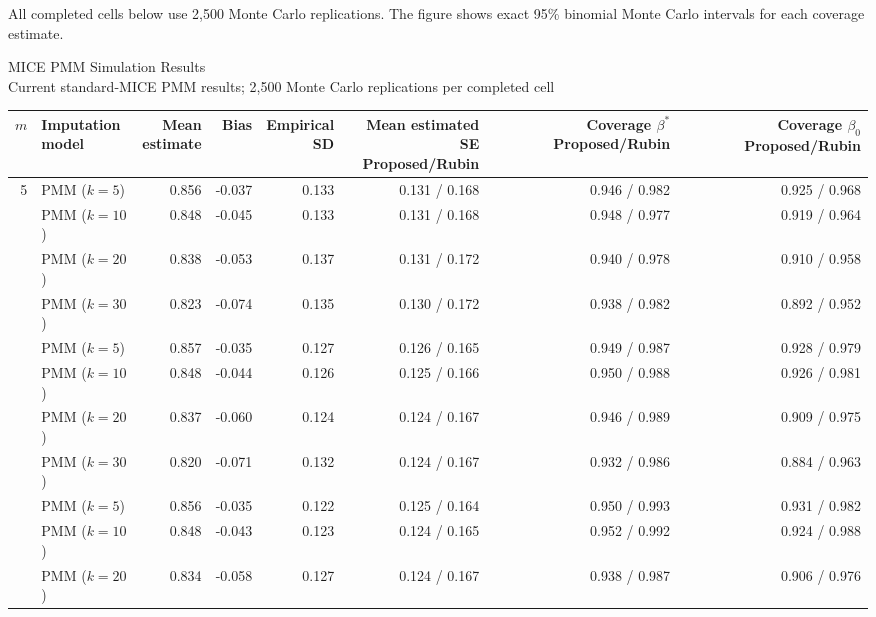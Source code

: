 \documentclass[11pt]{article}
\begin{document}
All completed cells below use 2,500 Monte Carlo replications. The figure shows exact 95\% binomial Monte Carlo intervals for each coverage estimate.
\clearpage
\begin{center}
{\Large MICE PMM Simulation Results}\\[4pt]
{\normalsize Current standard-MICE PMM results; 2,500 Monte Carlo replications per completed cell}
\end{center}
\vspace{4pt}
\begin{table}[H]
\centering
\scriptsize
\setlength{\tabcolsep}{2.6pt}
\begin{tabular}{rlrrrrrr}
\toprule
$m$ & \makecell{Imputation\\model} & \makecell{Mean\\estimate} & Bias &
\makecell{Empirical\\SD} & \makecell{Mean estimated SE\\Proposed/Rubin} &
\makecell{Coverage $\beta^\ast$\\Proposed/Rubin} &
\makecell{Coverage $\beta_0$\\Proposed/Rubin} \\
\midrule
5 & PMM ($k=5$) & 0.856 & -0.037 & 0.133 & 0.131 / 0.168 & 0.946 / 0.982 & 0.925 / 0.968 \\
 & PMM ($k=10$) & 0.848 & -0.045 & 0.133 & 0.131 / 0.168 & 0.948 / 0.977 & 0.919 / 0.964 \\
 & PMM ($k=20$) & 0.838 & -0.053 & 0.137 & 0.131 / 0.172 & 0.940 / 0.978 & 0.910 / 0.958 \\
 & PMM ($k=30$) & 0.823 & -0.074 & 0.135 & 0.130 / 0.172 & 0.938 / 0.982 & 0.892 / 0.952 \\
\addlinespace[2pt]
25 & PMM ($k=5$) & 0.857 & -0.035 & 0.127 & 0.126 / 0.165 & 0.949 / 0.987 & 0.928 / 0.979 \\
 & PMM ($k=10$) & 0.848 & -0.044 & 0.126 & 0.125 / 0.166 & 0.950 / 0.988 & 0.926 / 0.981 \\
 & PMM ($k=20$) & 0.837 & -0.060 & 0.124 & 0.124 / 0.167 & 0.946 / 0.989 & 0.909 / 0.975 \\
 & PMM ($k=30$) & 0.820 & -0.071 & 0.132 & 0.124 / 0.167 & 0.932 / 0.986 & 0.884 / 0.963 \\
\addlinespace[2pt]
50 & PMM ($k=5$) & 0.856 & -0.035 & 0.122 & 0.125 / 0.164 & 0.950 / 0.993 & 0.931 / 0.982 \\
 & PMM ($k=10$) & 0.848 & -0.043 & 0.123 & 0.124 / 0.165 & 0.952 / 0.992 & 0.924 / 0.988 \\
 & PMM ($k=20$) & 0.834 & -0.058 & 0.127 & 0.124 / 0.167 & 0.938 / 0.987 & 0.906 / 0.976 \\

\end{tabular}
\end{table}
\end{document}
